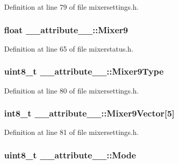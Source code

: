 \-Definition at line 79 of file mixersettings.\-h.

\hypertarget{struct____attribute_____afbd3dcd3077f3f60891522435b86a0e5}{
\subsubsection[{\-Mixer9}]{\setlength{\rightskip}{0pt plus 5cm}float {\bf \-\_\-\-\_\-attribute\-\_\-\-\_\-\-::\-Mixer9}}}\label{struct____attribute_____afbd3dcd3077f3f60891522435b86a0e5}


\-Definition at line 65 of file mixerstatus.\-h.

\hypertarget{struct____attribute_____abc7b15943a13a97f6cdb3e42441cdc36}{
\subsubsection[{\-Mixer9\-Type}]{\setlength{\rightskip}{0pt plus 5cm}uint8\-\_\-t {\bf \-\_\-\-\_\-attribute\-\_\-\-\_\-\-::\-Mixer9\-Type}}}\label{struct____attribute_____abc7b15943a13a97f6cdb3e42441cdc36}


\-Definition at line 80 of file mixersettings.\-h.

\hypertarget{struct____attribute_____ae662d3cf3cb389ba3222aee5912f47e5}{
\subsubsection[{\-Mixer9\-Vector}]{\setlength{\rightskip}{0pt plus 5cm}int8\-\_\-t {\bf \-\_\-\-\_\-attribute\-\_\-\-\_\-\-::\-Mixer9\-Vector}\mbox{[}5\mbox{]}}}\label{struct____attribute_____ae662d3cf3cb389ba3222aee5912f47e5}


\-Definition at line 81 of file mixersettings.\-h.

\hypertarget{struct____attribute_____ae9f6a35ab82662a153d3f2039a720235}{
\subsubsection[{\-Mode}]{\setlength{\rightskip}{0pt plus 5cm}uint8\-\_\-t {\bf \-\_\-\-\_\-attribute\-\_\-\-\_\-\-::\-Mode}}}\label{struct____attribute_____ae9f6a35ab82662a153d3f2039a720235}



